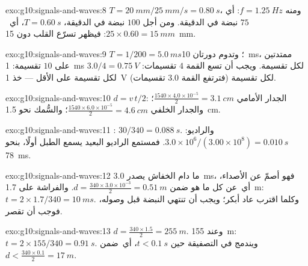 \begin{solution}{exo:g10:signals-and-waves:8}
$T = \qty{20}{mm}/\qty{25}{mm/s} = \qty{0.80}{s}$، ومنه
$f = \qty{1.25}{Hz}$: أي $75$ نبضة في الدقيقة. ومن أجل $100$ نبضة في الدقيقة،
$T = \qty{0.60}{s}$، أي\ $25 \times 0.60 = \qty{15}{mm}$: فيظهر تسرّع القلب
دون \qty{15}{mm}.
\end{solution}

\begin{solution}{exo:g10:signals-and-waves:9}
$T = 1/200 = \qty{5.0}{ms}$؛ وتدوم دورتان \qty{10}{ms}، ممتدتين على
$10$ تقسيمة:  \qty{1}{ms} لكل تقسيمة. ويجب أن تسع القمة
$4$ تقسيمات:  $3.0/4 = \qty{0.75}{V}$ لكل تقسيمة على الأقل ---
خذ \qty{1}{V} لكل تقسيمة (فترتفع القمة $3.0$ تقسيمات).
\end{solution}

\begin{solution}{exo:g10:signals-and-waves:10}
$d = v\,t/2$: الجدار الأمامي
$\frac{1540 \times 4.0\times10^{-5}}{2} = \qty{3.1}{cm}$؛ والجدار الخلفي
$\frac{1540 \times 6.0\times10^{-5}}{2} = \qty{4.6}{cm}$؛ والسُّمك
نحو \qty{1.5}{cm}.
\end{solution}

\begin{solution}{exo:g10:signals-and-waves:11}
: $30/340 = \qty{0.088}{s}$. والراديو:
$3.0\times10^{6}/(3.00\times10^{8}) = \qty{0.010}{s}$. فمستمع الراديو البعيد
يسمع الطبل أولًا، بنحو \qty{78}{ms}.
\end{solution}

\begin{solution}{exo:g10:signals-and-waves:12}
ما دام الخفاش يصدر \qty{3.0}{ms}، فهو أصمّ عن الأصداء، أي\ عن
كل ما هو ضمن $d = \frac{340 \times 3.0\times10^{-3}}{2} =
\qty{0.51}{m}$. والفراشة على \qty{1.7}{m}:
$t = 2 \times 1.7/340 = \qty{10}{ms}$. وكلما اقترب عاد 
أبكر؛ ويجب أن تنتهي النبضة قبل وصوله، فوجب أن تقصر.
\end{solution}

\begin{solution}{exo:g10:signals-and-waves:13}
$d = \frac{340 \times 1.5}{2} = \qty{255}{m}$. وعند \qty{155}{m}:
$t = 2 \times 155/340 = \qty{0.91}{s}$. ويندمج  في التصفيقة حين
$t < \qty{0.1}{s}$، أي\ ضمن
$d < \frac{340 \times 0.1}{2} = \qty{17}{m}$.
\end{solution}

